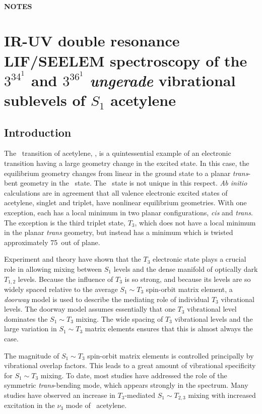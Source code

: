 \documentclass[12pt]{mitthesis}
\begin{document}
\tableofcontents
\clearpage

\subsubsection*{NOTES}
\clearpage

\setcounter{chapter}{5}
\chapter{IR-UV double resonance LIF/SEELEM spectroscopy of the
  $3^34^1$ and $3^36^1$ \emph{ungerade} vibrational sublevels of $S_1$
  acetylene}

\section{Introduction}

The \AtoX\ transition of acetylene, , is a quintessential
example of an electronic transition having a large geometry change in
the excited state.  In this case, the equilibrium geometry changes
from linear in the ground state to a planar \emph{trans}-bent geometry
in the \astate\ state.  The \astate\ state is not unique in this
respect.  \emph{Ab initio} calculations are in agreement that all
valence electronic excited states of acetylene, singlet and triplet,
have nonlinear equilibrium geometries.  With one exception, each has a
local minimum in two planar configurations, \emph{cis} and
\emph{trans}.  The exception is the third triplet state, $T_3$, which
does not have a local minimum in the planar \emph{trans} geometry, but
instead has a minimum which is twisted approximately 75\degrees\ out
of plane.

Experiment and theory have shown that the $T_3$ electronic state plays
a crucial role in allowing mixing between $S_1$ levels and the dense
manifold of optically dark $T_{1,2}$ levels.  Because the influence of
$T_3$ is so strong, and because its levels are so widely spaced
relative to the average $S_1 \sim T_3$ spin-orbit matrix element, a
\emph{doorway} model is used to describe the mediating role of individual
$T_3$ vibrational levels.  The doorway model assumes essentially that
one $T_3$ vibrational level dominates the $S_1 \sim T_3$ mixing.  The
wide spacing of $T_3$ vibrational levels and the large variation in $S_1
\sim T_3$ matrix elements ensures that this is almost always the case.

The magnitude of $S_1 \sim T_3$ spin-orbit matrix elements is
controlled principally by vibrational overlap factors.  This leads to
a great amount of vibrational specificity for $S_1 \sim T_3$ mixing.
To date, most studies have addressed the role of the symmetric
\emph{trans}-bending mode, which appears strongly in the \AtoX
spectrum.  Many studies have observed an increase in $T_3$-mediated
$S_1 \sim T_{2,3}$ mixing with increased excitation in the $\nu_3$
mode of \astate\ acetylene.
\end{document}

